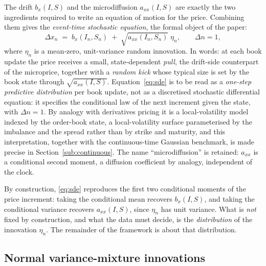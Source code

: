 \documentclass[11pt]{article}
\theoremstyle{plain}
\theoremstyle{definition}
\newcommand{\axx}{a_{xx}}
\begin{document}
The drift $b_x(I,S)$ and the microdiffusion $\axx(I,S)$ are exactly the two ingredients
required to write an equation of motion for the price. Combining them gives the
\emph{event-time stochastic equation}, the formal object of the paper:
\begin{equation}
  \boxed{\;\;
  \Delta x_n \;=\; b_x(I_n,S_n) \;+\; \sqrt{\axx(I_n,S_n)}\;\eta_n,
  \qquad \Delta n = 1,
  \;\;}
  \label{eq:sde}
\end{equation}
where $\eta_n$ is a mean-zero, unit-variance random innovation. In words: at each book
update the price receives a small, state-dependent \emph{pull}, the drift-side
counterpart of the microprice, together with a \emph{random kick} whose typical size is
set by the book state through $\sqrt{\axx(I,S)}$. Equation~\eqref{eq:sde} is to be read
as a \emph{one-step predictive distribution} per book update, not as a discretised
stochastic differential equation: it specifies the conditional law of the next increment
given the state, with $\Delta n=1$. By analogy with derivatives pricing it is a
local-volatility model indexed by the order-book state, a local-volatility surface
parameterised by the imbalance and the spread rather than by strike and maturity, and
this interpretation, together with the continuous-time Gaussian benchmark, is made
precise in Section~\ref{sub:continuous}. The name ``microdiffusion'' is retained: $\axx$
is a conditional second moment, a diffusion coefficient by analogy, independent of the
clock.

By construction, \eqref{eq:sde} reproduces the first two conditional moments of the
price increment: taking the conditional mean recovers $b_x(I,S)$, and taking the
conditional variance recovers $\axx(I,S)$, since $\eta_n$ has unit variance. What is
\emph{not} fixed by construction, and what the data must decide, is the
\emph{distribution} of the innovation $\eta_n$. The remainder of the framework is
about that distribution.

\subsection{Normal variance-mixture innovations}
\label{sub:innovation}
\end{document}
